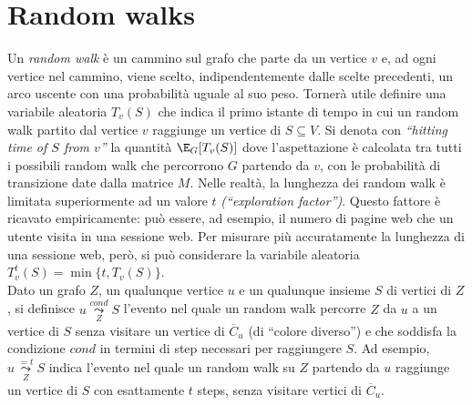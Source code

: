     \section{Random walks}
        Un \emph{random walk} è un cammino sul grafo che parte da un vertice $v$ e, ad ogni vertice nel cammino, viene scelto, 
        indipendentemente dalle scelte precedenti, un arco uscente con una probabilità uguale al suo peso. 
        Tornerà utile definire una variabile aleatoria $T_v(S)$ che indica il primo istante di tempo in cui un random walk partito 
        dal vertice $v$ raggiunge un vertice di $S\subseteq V$. Si denota con \emph{``hitting time of $S$ from $v$''} la quantità $\E_G[T_v(S)]$ 
        dove l'aspettazione è calcolata tra tutti i possibili random walk che percorrono $G$ partendo da $v$, con le probabilità di transizione date dalla matrice $M$.
        Nelle realtà, la lunghezza dei random walk è limitata superiormente ad un valore $t$ \emph{(``exploration factor'')}. Questo fattore è ricavato empiricamente: 
        può essere, ad esempio, il numero di pagine web che un utente visita in una sessione web. Per misurare più accuratamente la lunghezza di una sessione web,
        però, si può considerare la variabile aleatoria $T_{v}^{t}(S)=\min\{t,T_v(S)\}$.\\ 
        Dato un grafo $Z$, un qualunque vertice $u$ e un qualunque insieme $S$ di vertici di $Z$, si definisce $u \overset{cond}{\underset{Z}{\leadsto}}S$ 
        l'evento nel quale un random walk percorre $Z$ da $u$ a un vertice di $S$ senza visitare un vertice di $\overline{C}_u$ (di ``colore diverso'') 
        e che soddisfa la condizione $cond$ in termini di step necessari per raggiungere $S$. Ad esempio, $u \overset{=t}{\underset{Z}{\leadsto}}S$ indica l'evento nel quale 
        un random walk su $Z$ partendo da $u$ raggiunge un vertice di $S$ con esattamente $t$ steps, senza visitare vertici di $\overline{C}_u$.

    
